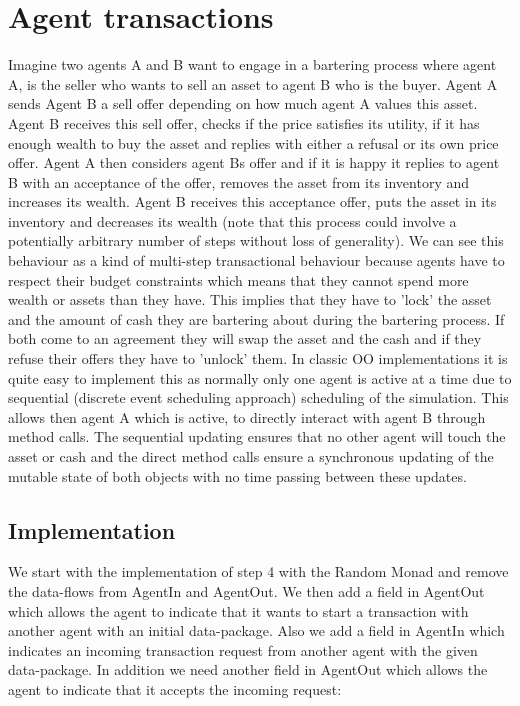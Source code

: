 \section{Agent transactions}
Imagine two agents A and B want to engage in a bartering process where agent A, is the seller who wants to sell an asset to agent B who is the buyer. Agent A sends Agent B a sell offer depending on how much agent A values this asset. Agent B receives this sell offer, checks if the price satisfies its utility, if it has enough wealth to buy the asset and replies with either a refusal or its own price offer. Agent A then considers agent Bs offer and if it is happy it replies to agent B with an acceptance of the offer, removes the asset from its inventory and increases its wealth. Agent B receives this acceptance offer, puts the asset in its inventory and decreases its wealth (note that this process could involve a potentially arbitrary number of steps without loss of generality).
We can see this behaviour as a kind of multi-step transactional behaviour because agents have to respect their budget constraints which means that they cannot spend more wealth or assets than they have. This implies that they have to 'lock' the asset and the amount of cash they are bartering about during the bartering process. If both come to an agreement they will swap the asset and the cash and if they refuse their offers they have to 'unlock' them.
In classic OO implementations it is quite easy to implement this as normally only one agent is active at a time due to sequential (discrete event scheduling approach) scheduling of the simulation. This allows then agent A which is active, to directly interact with agent B through method calls. The sequential updating ensures that no other agent will touch the asset or cash and the direct method calls ensure a synchronous updating of the mutable state of both objects with no time passing between these updates.

\subsection{Implementation}
We start with the implementation of step 4 with the Random Monad and remove the data-flows from AgentIn and AgentOut. We then add a field in AgentOut which allows the agent to indicate that it wants to start a transaction with another agent with an initial data-package. Also we add a field in AgentIn which indicates an incoming transaction request from another agent with the given data-package. In addition we need another field in AgentOut which allows the agent to indicate that it accepts the incoming request:

